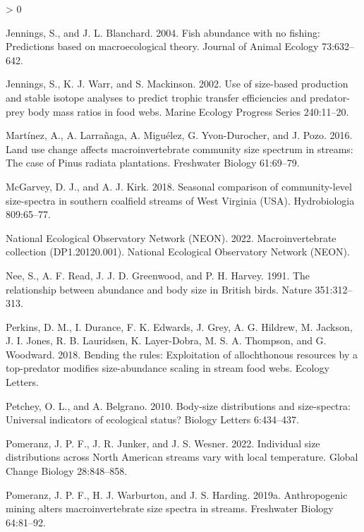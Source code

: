 \documentclass[
]{article}
\newlength{\cslhangindent}
\newenvironment{CSLReferences}[2] %
 {%
  \setlength{\parindent}{0pt}
  \ifodd #1 \everypar{\setlength{\hangindent}{\cslhangindent}}\ignorespaces\fi
  \ifnum #2 > 0
  \setlength{\parskip}{#2\baselineskip}
  \fi
 }%
 {}
\begin{document}
\begin{CSLReferences}{1}{0}
\leavevmode\hypertarget{ref-jennings2004}{}%
Jennings, S., and J. L. Blanchard. 2004. Fish abundance with no fishing:
Predictions based on macroecological theory. Journal of Animal Ecology
73:632--642.

\leavevmode\hypertarget{ref-Jennings2002}{}%
Jennings, S., K. J. Warr, and S. Mackinson. 2002. Use of size-based
production and stable isotope analyses to predict trophic transfer
efficiencies and predator-prey body mass ratios in food webs. Marine
Ecology Progress Series 240:11--20.

\leavevmode\hypertarget{ref-martinez2016}{}%
Martínez, A., A. Larrañaga, A. Miguélez, G. Yvon-Durocher, and J. Pozo.
2016. Land use change affects macroinvertebrate community size spectrum
in streams: The case of {Pinus} radiata plantations. Freshwater Biology
61:69--79.

\leavevmode\hypertarget{ref-mcgarvey2018}{}%
McGarvey, D. J., and A. J. Kirk. 2018. Seasonal comparison of
community-level size-spectra in southern coalfield streams of {West
Virginia} ({USA}). Hydrobiologia 809:65--77.

\leavevmode\hypertarget{ref-NEON_Inverts2022}{}%
National Ecological Observatory Network (NEON). 2022. Macroinvertebrate
collection ({DP1}.20120.001). {National Ecological Observatory Network
(NEON)}.

\leavevmode\hypertarget{ref-Nee1991}{}%
Nee, S., A. F. Read, J. J. D. Greenwood, and P. H. Harvey. 1991. The
relationship between abundance and body size in {British} birds. Nature
351:312--313.

\leavevmode\hypertarget{ref-perkins2018}{}%
Perkins, D. M., I. Durance, F. K. Edwards, J. Grey, A. G. Hildrew, M.
Jackson, J. I. Jones, R. B. Lauridsen, K. Layer-Dobra, M. S. A.
Thompson, and G. Woodward. 2018. Bending the rules: Exploitation of
allochthonous resources by a top-predator modifies size-abundance
scaling in stream food webs. Ecology Letters.

\leavevmode\hypertarget{ref-Petchey2010}{}%
Petchey, O. L., and A. Belgrano. 2010. Body-size distributions and
size-spectra: Universal indicators of ecological status? Biology Letters
6:434--437.

\leavevmode\hypertarget{ref-pomeranz2022}{}%
Pomeranz, J. P. F., J. R. Junker, and J. S. Wesner. 2022. Individual
size distributions across {North American} streams vary with local
temperature. Global Change Biology 28:848--858.

\leavevmode\hypertarget{ref-pomeranz2019}{}%
Pomeranz, J. P. F., H. J. Warburton, and J. S. Harding. 2019a.
Anthropogenic mining alters macroinvertebrate size spectra in streams.
Freshwater Biology 64:81--92.


\end{CSLReferences}
\end{document}
